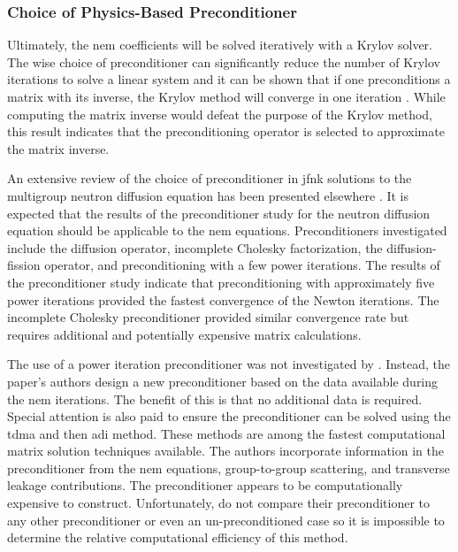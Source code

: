     \subsubsection{Choice of Physics-Based Preconditioner}
      Ultimately, the \gls{nem} coefficients will be solved iteratively with a
      Krylov solver. The wise choice of preconditioner can significantly reduce 
      the number of Krylov iterations to solve a linear system and it can be
      shown that if one preconditions a matrix with its inverse, the Krylov
      method will converge in one iteration \cite{textbookkelley}. While
      computing the matrix inverse would defeat the purpose of the Krylov
      method, this result indicates that the preconditioning operator is
      selected to approximate the matrix inverse.

      An extensive review of the choice of preconditioner in \gls{jfnk}
      solutions to the multigroup neutron diffusion equation has been presented
      elsewhere \cite{gill_azmy}. It is expected that the results of the
      preconditioner study for the neutron diffusion equation should be
      applicable to the \gls{nem} equations. Preconditioners investigated
      include the diffusion operator, incomplete Cholesky factorization, the
      diffusion-fission operator, and preconditioning with a few power
      iterations. The results of the preconditioner study indicate that
      preconditioning with approximately five power iterations provided the
      fastest convergence of the Newton iterations. The incomplete Cholesky
      preconditioner provided similar convergence rate but requires additional
      and potentially expensive matrix calculations.

      The use of a power iteration preconditioner was not investigated by
      \citeauthor{qe2paper}. Instead, the paper's authors design a new
      preconditioner based on the data available during the \gls{nem}
      iterations. The benefit of this is that no additional data is required.
      Special attention is also paid to ensure the preconditioner can be solved
      using the \gls{tdma} and then \gls{adi} method. These methods are among
      the fastest computational matrix solution techniques available. The
      authors incorporate information in the preconditioner from the \gls{nem}
      equations, group-to-group scattering, and transverse leakage
      contributions. The preconditioner appears to be computationally expensive
      to construct. Unfortunately, \citeauthor{qe2paper} do not compare their 
      preconditioner to any other preconditioner or even an un-preconditioned
      case so it is impossible to determine the relative computational
      efficiency of this method.

